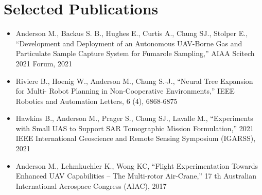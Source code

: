 \documentclass{article}
\begin{document}
\section*{Selected Publications}
\begin{itemize}
 \item Anderson M., Backus S. B., Hughes E., Curtis A., Chung SJ., Stolper E., “Development and Deployment of an Autonomous UAV-Borne Gas and Particulate Sample Capture System for Fumarole Sampling,'' AIAA Scitech 2021 Forum, 2021 
 \item Riviere B., Hoenig W., Anderson M., Chung S.-J., “Neural Tree Expansion for Multi- Robot Planning in Non-Cooperative Environments,” IEEE Robotics and Automation Letters, 6 (4), 6868-6875 
 \item Hawkins B., Anderson M., Prager S., Chung SJ., Lavalle M., “Experiments with Small UAS to Support SAR Tomographic Mission Formulation,'' 2021 IEEE International Geoscience and Remote Sensing Symposium (IGARSS), 2021 
 \item Anderson M., Lehmkuehler K., Wong KC, “Flight Experimentation Towards Enhanced UAV Capabilities -- The Multi-rotor Air-Crane,'' 17 th Australian International Aerospace Congress (AIAC), 2017 
\end{itemize} 

\vspace*{\fill}
\end{document}
